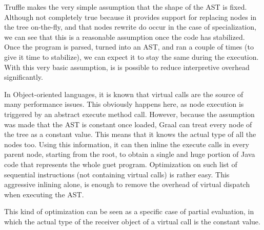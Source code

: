 \documentclass[twoside,11pt,a4paper]{article}
\newcommand{\java}[1]{\textsf{#1}}
\begin{document}
Truffle makes the very simple assumption that the shape of the AST is fixed. Although not completely true because it provides support for replacing nodes in the tree on-the-fly, and that nodes rewrite do occur in the case of specialization, we can see that this is a reasonable assumption once the code has stabilized. Once the program is parsed, turned into an AST, and ran a couple of times (to give it time to stabilize), we can expect it to stay the same during the execution. With this very basic assumption, is is possible to reduce interpretive overhead significantly.

In Object-oriented languages, it is known that virtual calls are the source of many performance issues. This obviously happens here, as node execution is triggered by an abstract \java{execute} method call. However, because the assumption was made that the AST is constant once loaded, Graal can treat every node of the tree as a constant value. This means that it knows the actual type of all the nodes too. Using this information, it can then inline the \java{execute} calls in every parent node, starting from the root, to obtain a single and huge portion of Java code that represents the whole guet program. Optimization on such list of sequential instructions (not containing virtual calls) is rather easy. This aggressive inlining alone, is enough to remove the overhead of virtual dispatch when executing the AST.

This kind of optimization can be seen as a specific case of partial evaluation, in which the actual type of the receiver object of a virtual call is the constant value.
\end{document}
